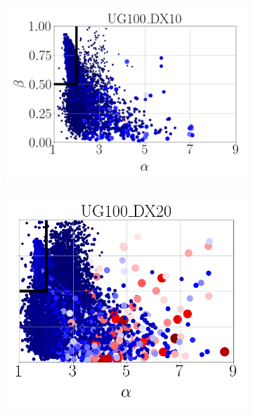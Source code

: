 \begin{figure}[ht]
\centering
\begin{subfigure}[b]{0.4\textwidth}
	\centering
	\hspace*{-0.2in}
   \includegraphics[scale=0.3]{./part2_developments/figures_ch5_resolved_JICF/SPRAY_characterization/deformation/scatter_alpha_beta_UG10_DX10.png}
\end{subfigure}
\begin{subfigure}[b]{0.4\textwidth}
	\centering
	\hspace*{0.35in}
   \includegraphics[scale=0.3]{./part2_developments/figures_ch5_resolved_JICF/SPRAY_characterization/deformation/scatter_alpha_beta_UG10_DX20.png}

\end{subfigure}
\end{figure}
